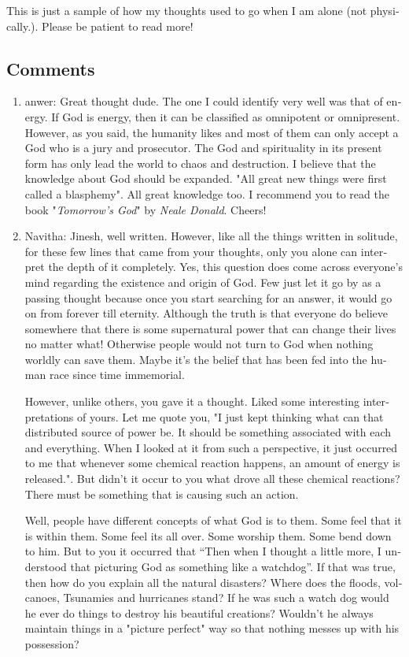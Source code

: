 \begin{english}
This is just a sample of how my thoughts used to go when I am alone (not physically.). Please be patient to read more!

\subsection*{Comments}
\begin{enumerate}
\item{anwer: }
Great thought dude. The one I could identify very well was that of energy. If God is energy, then it can be classified as omnipotent or omnipresent. However, as you said, the humanity likes and most of them can only accept a God who is a jury and prosecutor. The God and spirituality in its present form has only lead the world to chaos and destruction. I believe that the knowledge about God should be expanded. "All great new things were first called a blasphemy". All great knowledge too. I recommend you to read the book "\emph{Tomorrow's God}" by \emph{Neale Donald}. Cheers!

\item{Navitha: }
Jinesh, well written. However, like all the things written in solitude, for these few lines that came from your thoughts, only you alone can interpret the depth of it completely. Yes, this question does come across everyone's mind regarding the existence and origin of God. Few just let it go by as a passing thought because once you start searching for an answer, it would go on from forever till eternity. Although the truth is that everyone do believe somewhere that there is some supernatural power that can change their lives no matter what! Otherwise people would not turn to God when nothing worldly can save them. Maybe it's the belief that has been fed into the human race since time immemorial.

However, unlike others, you gave it a thought. Liked some interesting interpretations of yours.
Let me quote you, "I just kept thinking what can that distributed source of power be. It should be something associated with each and everything. When I looked at it from such a perspective, it just occurred to me that whenever some chemical reaction happens, an amount of energy is released.". But didn't it occur to you what drove all these chemical reactions? There must be something that is causing such an action.

Well, people have different concepts of what God is to them. Some feel that it is within them. Some feel its all over. Some worship them. Some bend down to him.
But to you it occurred that “Then when I thought a little more, I understood that picturing God as something like a watchdog”. If that was true, then how do you explain all the natural disasters? Where does the floods, volcanoes, Tsunamies and hurricanes stand? If he was such a watch dog would he ever do things to destroy his beautiful creations? Wouldn't he always maintain things in a "picture perfect" way so that nothing messes up with his possession?



\end{enumerate}
\end{english}
